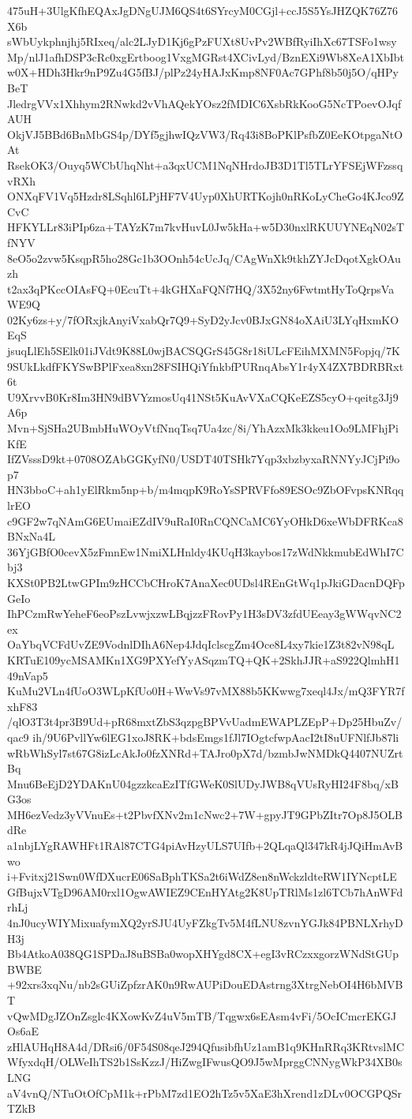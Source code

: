 475uH+3UlgKfhEQAxJgDNgUJM6QS4t6SYrcyM0CGjl+ccJ5S5YsJHZQK76Z76X6b
sWbUykphnjhj5RIxeq/alc2LJyD1Kj6gPzFUXt8UvPv2WBfRyiIhXc67TSFo1wsy
Mp/nlJ1afhDSP3cRc0xgErtboog1VxgMGRst4XCivLyd/BznEXi9Wb8XeA1XbIbt
w0X+HDh3Hkr9nP9Zu4G5fBJ/plPz24yHAJxKmp8NF0Ac7GPhf8b50j5O/qHPyBeT
JledrgVVx1Xhhym2RNwkd2vVhAQekYOsz2fMDIC6XsbRkKooG5NcTPoevOJqfAUH
OkjVJ5BBd6BnMbGS4p/DYf5gjhwIQzVW3/Rq43i8BoPKlPsfbZ0EeKOtpgaNtOAt
RsekOK3/Ouyq5WCbUhqNht+a3qxUCM1NqNHrdoJB3D1Tl5TLrYFSEjWFzssqvRXh
ONXqFV1Vq5Hzdr8LSqhl6LPjHF7V4Uyp0XhURTKojh0nRKoLyCheGo4KJco9ZCvC
HFKYLLr83iPIp6za+TAYzK7m7kvHuvL0Jw5kHa+w5D30nxlRKUUYNEqN02sTfNYV
8eO5o2zvw5KsqpR5ho28Gc1b3OOnh54cUcJq/CAgWnXk9tkhZYJcDqotXgkOAuzh
t2ax3qPKccOIAsFQ+0EcuTt+4kGHXaFQNf7HQ/3X52ny6FwtmtHyToQrpsVaWE9Q
02Ky6zs+y/7fORxjkAnyiVxabQr7Q9+SyD2yJcv0BJxGN84oXAiU3LYqHxmKOEqS
jsuqLlEh5SElk01iJVdt9K88L0wjBACSQGrS45G8r18iULcFEihMXMN5Fopjq/7K
9SUkLkdfFKYSwBPlFxea8xn28FSIHQiYfnkbfPURnqAbsY1r4yX4ZX7BDRBRxt6t
U9XrvvB0Kr8Im3HN9dBVYzmosUq41NSt5KuAvVXaCQKeEZS5cyO+qeitg3Jj9A6p
Mvn+SjSHa2UBmbHuWOyVtfNnqTsq7Ua4zc/8i/YhAzxMk3kkeu1Oo9LMFhjPiKfE
IfZVsssD9kt+0708OZAbGGKyfN0/USDT40TSHk7Yqp3xbzbyxaRNNYyJCjPi9op7
HN3bboC+ah1yElRkm5np+b/m4mqpK9RoYsSPRVFfo89ESOc9ZbOFvpsKNRqqlrEO
c9GF2w7qNAmG6EUmaiEZdIV9uRaI0RnCQNCaMC6YyOHkD6xeWbDFRKca8BNxNa4L
36YjGBfO0cevX5zFmnEw1NmiXLHnldy4KUqH3kaybos17zWdNkkmubEdWhI7Cbj3
KXSt0PB2LtwGPIm9zHCCbCHroK7AnaXec0UDsl4REnGtWq1pJkiGDacnDQFpGeIo
IhPCzmRwYeheF6eoPszLvwjxzwLBqjzzFRovPy1H3sDV3zfdUEeay3gWWqvNC2ex
OaYbqVCFdUvZE9VodnlDIhA6Nep4JdqIclscgZm4Oce8L4xy7kie1Z3t82vN98qL
KRTuE109ycMSAMKn1XG9PXYefYyASqzmTQ+QK+2SkhJJR+aS922QlmhH149nVap5
KuMu2VLn4fUoO3WLpKfUo0H+WwVs97vMX88b5KKwwg7xeql4Jx/mQ3FYR7fxhF83
/qlO3T3t4pr3B9Ud+pR68mxtZbS3qzpgBPVvUadmEWAPLZEpP+Dp25HbuZv/qac9
ih/9U6PvllYw6lEG1xoJ8RK+bdsEmgs1fJl7IOgtcfwpAacI2tI8uUFNlfJb87li
wRbWhSyl7st67G8izLcAkJo0fzXNRd+TAJro0pX7d/bzmbJwNMDkQ4407NUZrtBq
Mnu6BeEjD2YDAKnU04gzzkcaEzITfGWeK0SlUDyJWB8qVUsRyHI24F8bq/xBG3os
MH6ezVedz3yVVnuEs+t2PbvfXNv2m1cNwc2+7W+gpyJT9GPbZItr7Op8J5OLBdRe
a1nbjLYgRAWHFt1RAl87CTG4piAvHzyULS7UIfb+2QLqaQl347kR4jJQiHmAvBwo
i+Fvitxj21Swn0WfDXucrE06SaBphTKSa2t6iWdZ8en8nWckzldteRW1IYNcptLE
GfBujxVTgD96AM0rxl1OgwAWIEZ9CEnHYAtg2K8UpTRlMs1zl6TCb7hAnWFdrhLj
4nJ0ucyWIYMixuafymXQ2yrSJU4UyFZkgTv5M4fLNU8zvnYGJk84PBNLXrhyDH3j
Bb4AtkoA038QG1SPDaJ8uBSBa0wopXHYgd8CX+egI3vRCzxxgorzWNdStGUpBWBE
+92xrs3xqNu/nb2sGUiZpfzrAK0n9RwAUPiDouEDAstrng3XtrgNebOI4H6bMVBT
vQwMDgJZOnZsglc4KXowKvZ4uV5mTB/Tqgwx6sEAsm4vFi/5OcICmcrEKGJOs6aE
zHlAUHqH8A4d/DRsi6/0F54S08qeJ294QfusibfhUz1amB1q9KHnRRq3KRtvslMC
WfyxdqH/OLWeIhTS2b1SsKzzJ/HiZwgIFwusQO9J5wMprggCNNygWkP34XB0sLNG
aV4vnQ/NTuOtOfCpM1k+rPbM7zd1EO2hTz5v5XaE3hXrend1zDLv0OCGPQSrTZkB
